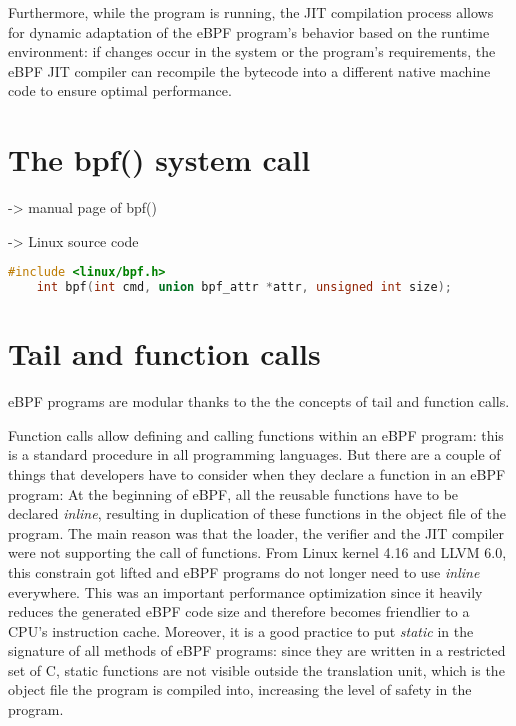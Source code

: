 Furthermore, while the program is running, the JIT compilation process allows for dynamic adaptation of the eBPF program's behavior based on the runtime environment: if changes occur in the system or the program's requirements, the eBPF JIT compiler can recompile the bytecode into a different native machine code to ensure optimal performance.

\section{The bpf() system call}


\cite{BPFManPage} -> manual page of bpf()

\cite{BPFDoc} -> Linux source code

\begin{lstlisting}[language=C]
	#include <linux/bpf.h>
	int bpf(int cmd, union bpf_attr *attr, unsigned int size);
\end{lstlisting}

\section{Tail and function calls}

eBPF programs are modular thanks to the the concepts of tail and function calls.
 
Function calls allow defining and calling functions within an eBPF program: this is a standard procedure in all programming languages. 
But there are a couple of things that developers have to consider when they declare a function in an eBPF program:
At the beginning of eBPF, all the reusable functions have to be declared \textit{inline}, resulting in duplication of these functions in the object file of the program.
The main reason was that the loader, the verifier and the JIT compiler were not supporting the call of functions.
From Linux kernel 4.16 and LLVM 6.0, this constrain got lifted and eBPF programs do not longer need to use \textit{inline} everywhere.
This was an important performance optimization since it heavily reduces the generated eBPF code size and therefore becomes friendlier to a CPU’s instruction cache.
Moreover, it is a good practice to put \textit{static} in the signature of all methods of eBPF programs: since they are written in a restricted set of C, static functions are not	visible outside the translation unit, which is the object file the program is compiled into, increasing the level of safety in the program.

